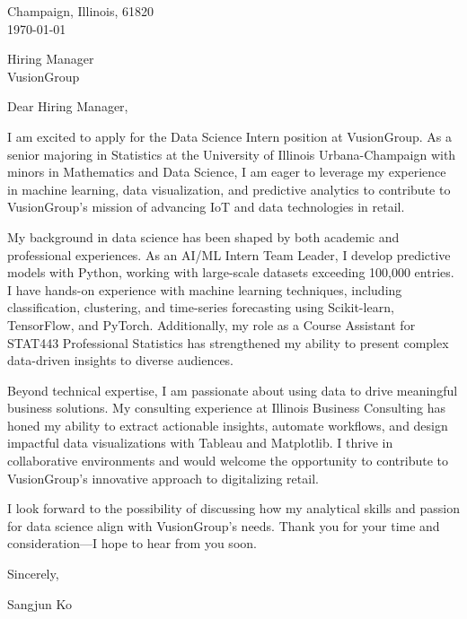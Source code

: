 \documentclass[11pt]{article}
\begin{document}
\noindent
Champaign, Illinois, 61820 \\
\today
\vspace{2em}

\noindent
Hiring Manager \\
VusionGroup

\vspace{1.5em}

Dear Hiring Manager,

I am excited to apply for the Data Science Intern position at VusionGroup. As a senior majoring in Statistics at the University of Illinois Urbana-Champaign with minors in Mathematics and Data Science, I am eager to leverage my experience in machine learning, data visualization, and predictive analytics to contribute to VusionGroup’s mission of advancing IoT and data technologies in retail.

My background in data science has been shaped by both academic and professional experiences. As an AI/ML Intern Team Leader, I develop predictive models with Python, working with large-scale datasets exceeding 100,000 entries. I have hands-on experience with machine learning techniques, including classification, clustering, and time-series forecasting using Scikit-learn, TensorFlow, and PyTorch. Additionally, my role as a Course Assistant for STAT443 Professional Statistics has strengthened my ability to present complex data-driven insights to diverse audiences.

Beyond technical expertise, I am passionate about using data to drive meaningful business solutions. My consulting experience at Illinois Business Consulting has honed my ability to extract actionable insights, automate workflows, and design impactful data visualizations with Tableau and Matplotlib. I thrive in collaborative environments and would welcome the opportunity to contribute to VusionGroup’s innovative approach to digitalizing retail.

I look forward to the possibility of discussing how my analytical skills and passion for data science align with VusionGroup’s needs. Thank you for your time and consideration—I hope to hear from you soon.

\vspace{1em}

Sincerely,

\vspace{2em}

Sangjun Ko
\end{document}
